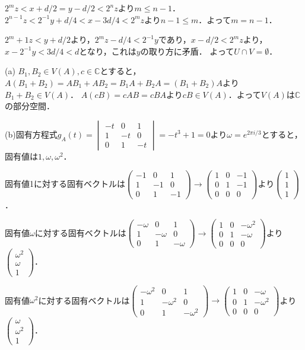 \documentclass[
		book,
		head_space=20mm,
		foot_space=20mm,
		gutter=10mm,
		line_length=190mm
]{jlreq}
\begin{document}
$2^mz<x+d/2=y-d/2<2^nz$より$m\le n-1$．$2^{n-1}z < 2^{-1}y+d/4<x-3d/4<2^mz$より$n-1\le m$．よって$m=n-1$．

$2^m+1z<y+d/2$より，$2^mz-d/4<2^{-1}y$であり，$x-d/2<2^mz$より，
$x-2^{-1}y < 3d/4<d$となり，これは$y$の取り方に矛盾．
よって$U\cap V=\emptyset$．

(a) $B_1,B_2\in V(A),c\in \mathbb{C}$とすると，$A(B_1+B_2)=AB_1+AB_2=B_1A+B_2A=(B_1+B_2)A$より$B_1+B_2\in V(A)$．
$A(cB)=cAB=cBA$より$cB\in V(A)$．よって$V(A)$は$\mathbb{C}$の部分空間．

(b)固有方程式$g_A(t)=\begin{vmatrix}
    -t & 0 & 1\\
    1 & -t & 0\\
    0 & 1 & -t
\end{vmatrix}=-t^3+1=0$より$\omega=e^{2\pi i/3}$とすると，固有値は$1,\omega,\omega^2$．

固有値1に対する固有ベクトルは$\begin{pmatrix}
    -1 & 0 & 1\\
    1 & -1 & 0\\
    0 & 1 & -1
\end{pmatrix}\rightarrow \begin{pmatrix}
    1 & 0 & -1\\
    0 & 1 & -1\\
    0 & 0 & 0
\end{pmatrix}$より$\begin{pmatrix}
    1\\
    1\\
    1
\end{pmatrix}$．

固有値$\omega$に対する固有ベクトルは$\begin{pmatrix}
    -\omega & 0 & 1\\
    1 & -\omega & 0\\
    0 & 1 & -\omega
\end{pmatrix}\rightarrow \begin{pmatrix}
    1 & 0 & -\omega^2\\
    0 & 1 & -\omega\\
    0 & 0 & 0
\end{pmatrix}$より$\begin{pmatrix}
    \omega^2\\
    \omega\\
    1
\end{pmatrix}$．

固有値$\omega^2$に対する固有ベクトルは$\begin{pmatrix}
    -\omega^2 & 0 & 1\\
    1 & -\omega^2 & 0\\
    0 & 1 & -\omega^2
\end{pmatrix}\rightarrow \begin{pmatrix}
    1 & 0 & -\omega\\
    0 & 1 & -\omega^2\\
    0 & 0 & 0
\end{pmatrix}$より$\begin{pmatrix}
    \omega\\
    \omega^2\\
    1
\end{pmatrix}$．
\end{document}
